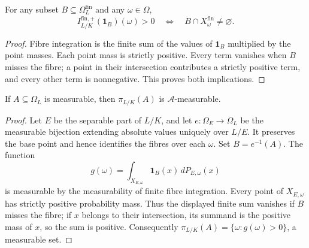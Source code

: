 \begin{lemma}
\label{lem:finite-fibre-indicator-positive}
\leanok
{}
For any subset $B\subseteq\Omega_L^{\mathrm{fin}}$ and any
$\omega\in\Omega$,
\[
 I^{\mathrm{fin},+}_{L/K}(\mathbf1_B)(\omega)>0
 \quad\Longleftrightarrow\quad B\cap X_\omega^{\mathrm{fin}}\ne\varnothing.
\]
\end{lemma}
\begin{proof}
Fibre integration is the finite sum of the values of $\mathbf1_B$
multiplied by the point masses. Each point mass is strictly positive.
Every term vanishes when $B$ misses the fibre; a point in their
intersection contributes a strictly positive term, and every other
term is nonnegative. This proves both implications.
\end{proof}

\begin{lemma}
\label{lem:finite-projection-measurable-image}
\leanok
{}
If $A\subseteq\Omega_L$ is measurable, then $\pi_{L/K}(A)$ is
$\mathcal A$-measurable.
\end{lemma}
\begin{proof}
Let $E$ be the separable part of $L/K$, and let
$e:\Omega_E\to\Omega_L$ be the measurable bijection extending absolute
values uniquely over $L/E$. It preserves the base point and hence
identifies the fibres over each $\omega$. Set $B=e^{-1}(A)$.
The function
\[
 g(\omega)=\int_{X_{E,\omega}}\mathbf1_B(x)\,dP_{E,\omega}(x)
\]
is measurable by the measurability of finite fibre integration.
Every point of $X_{E,\omega}$ has strictly positive probability mass.
Thus the displayed finite sum vanishes if $B$ misses the fibre; if
$x$ belongs to their intersection, its summand is the positive mass
of $x$, so the sum is positive. Consequently
$\pi_{L/K}(A)=\{\omega:g(\omega)>0\}$, a measurable set.
\end{proof}

